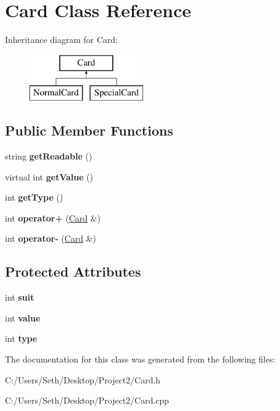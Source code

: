 \hypertarget{class_card}{}\section{Card Class Reference}
\label{class_card}
Inheritance diagram for Card\+:\begin{figure}[H]
\begin{center}
\leavevmode
\includegraphics[height=2.000000cm]{class_card}
\end{center}
\end{figure}
\subsection*{Public Member Functions}
\begin{DoxyCompactItemize}
\item 
\mbox{\label{class_card_a38da8da2b9f38a613f327a50cde3da34}} 
string {\bfseries get\+Readable} ()
\item 
\mbox{\label{class_card_ae6327dfb90c513f455c2e0db427cbcee}} 
virtual int {\bfseries get\+Value} ()
\item 
\mbox{\label{class_card_a43f6f0bd60e577a7be3c58fa447f45e7}} 
int {\bfseries get\+Type} ()
\item 
\mbox{\label{class_card_aa77888deaf592cad11eae8b28885d0d0}} 
int {\bfseries operator+} (\mbox{\hyperlink{class_card}{Card}} \&)
\item 
\mbox{\label{class_card_aef84e6680ad60e31734daf9e57deb69a}} 
int {\bfseries operator-\/} (\mbox{\hyperlink{class_card}{Card}} \&)
\end{DoxyCompactItemize}
\subsection*{Protected Attributes}
\begin{DoxyCompactItemize}
\item 
\mbox{\label{class_card_a68d1b935f3e4830af01fb9dba6c8220a}} 
int {\bfseries suit}
\item 
\mbox{\label{class_card_a57c4269cef032dac1f282c9b2be3be4d}} 
int {\bfseries value}
\item 
\mbox{\label{class_card_ad7f5c3654b479f739fab1bcfed5e2765}} 
int {\bfseries type}
\end{DoxyCompactItemize}


The documentation for this class was generated from the following files\+:\begin{DoxyCompactItemize}
\item 
C\+:/\+Users/\+Seth/\+Desktop/\+Project2/Card.\+h\item 
C\+:/\+Users/\+Seth/\+Desktop/\+Project2/Card.\+cpp\end{DoxyCompactItemize}
